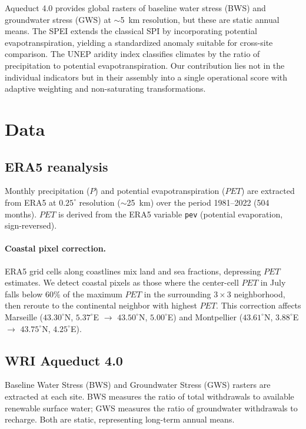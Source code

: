 \documentclass[11pt,a4paper]{article}
\begin{document}
Aqueduct 4.0 \citep{hofste2019} provides global rasters of baseline water stress (BWS) and groundwater stress (GWS) at $\sim$5~km resolution, but these are static annual means. The SPEI \citep{vicenteserrano2010,begueria2014} extends the classical SPI by incorporating potential evapotranspiration, yielding a standardized anomaly suitable for cross-site comparison. The UNEP aridity index \citep{unep1992,middleton1997} classifies climates by the ratio of precipitation to potential evapotranspiration. Our contribution lies not in the individual indicators but in their assembly into a single operational score with adaptive weighting and non-saturating transformations.

\section{Data}

\subsection{ERA5 reanalysis}

Monthly precipitation ($P$) and potential evapotranspiration ($PET$) are extracted from ERA5 \citep{hersbach2020} at $0.25^\circ$ resolution ($\sim$25~km) over the period 1981--2022 (504 months). $PET$ is derived from the ERA5 variable \texttt{pev} (potential evaporation, sign-reversed).

\paragraph{Coastal pixel correction.} ERA5 grid cells along coastlines mix land and sea fractions, depressing $PET$ estimates. We detect coastal pixels as those where the center-cell $PET$ in July falls below 60\% of the maximum $PET$ in the surrounding $3\times3$ neighborhood, then reroute to the continental neighbor with highest $PET$. This correction affects Marseille ($43.30^\circ$N, $5.37^\circ$E $\to$ $43.50^\circ$N, $5.00^\circ$E) and Montpellier ($43.61^\circ$N, $3.88^\circ$E $\to$ $43.75^\circ$N, $4.25^\circ$E).

\subsection{WRI Aqueduct 4.0}

Baseline Water Stress (BWS) and Groundwater Stress (GWS) rasters are extracted at each site. BWS measures the ratio of total withdrawals to available renewable surface water; GWS measures the ratio of groundwater withdrawals to recharge. Both are static, representing long-term annual means.
\end{document}
